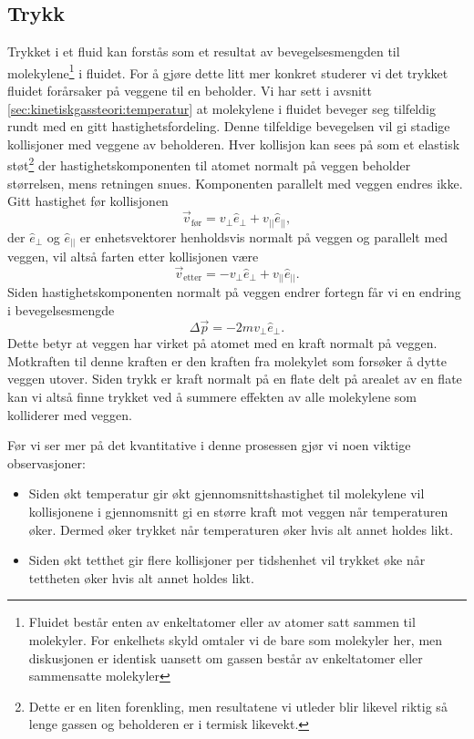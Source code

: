 \subsection{Trykk}
Trykket i et fluid kan forstås som et resultat av bevegelsesmengden til molekylene\footnote{Fluidet består enten av enkeltatomer eller av atomer satt sammen til molekyler. For enkelhets skyld omtaler vi de bare som molekyler her, men diskusjonen er identisk uansett om gassen består av enkeltatomer eller sammensatte molekyler} i fluidet. For å gjøre dette litt mer konkret studerer vi det  trykket fluidet forårsaker på veggene til en beholder. Vi har sett i avsnitt \ref{sec:kinetiskgassteori:temperatur} at molekylene i fluidet beveger seg tilfeldig rundt med en gitt hastighetsfordeling. Denne tilfeldige bevegelsen vil gi stadige kollisjoner med veggene av beholderen. Hver kollisjon kan sees på som et elastisk støt\footnote{Dette er en liten forenkling, men resultatene vi utleder blir likevel riktig så lenge gassen og beholderen er i termisk likevekt.} der hastighetskomponenten til atomet normalt på veggen beholder størrelsen, mens retningen snues. Komponenten parallelt med veggen endres ikke. Gitt hastighet før kollisjonen
\begin{displaymath}
	\vec{v}_\text{før} = v_\perp \hat{e}_\perp + v_{||} \hat{e}_{||},
\end{displaymath}
der $ \hat{e}_\perp$ og $\hat{e}_{||}$ er enhetsvektorer henholdsvis normalt på veggen og parallelt med veggen, vil altså farten etter kollisjonen være
\begin{displaymath}
	\vec{v}_\text{etter} = -v_\perp \hat{e}_\perp + v_{||} \hat{e}_{||}.
\end{displaymath}
Siden hastighetskomponenten normalt på veggen endrer fortegn får vi en endring i bevegelsesmengde 
\begin{displaymath}
	\Delta \vec{p} = -2mv_\perp\hat{e}_\perp.
\end{displaymath}
Dette betyr at veggen har virket på atomet med en kraft normalt på veggen. Motkraften til denne kraften er den kraften fra molekylet som forsøker å dytte veggen utover. Siden trykk er kraft normalt på en flate delt på arealet av en flate kan vi altså finne trykket ved å summere effekten av alle molekylene som kolliderer med veggen.

Før vi ser mer på det kvantitative i denne prosessen gjør vi noen viktige observasjoner:
\begin{itemize}
\item
Siden økt temperatur gir økt gjennomsnittshastighet til molekylene vil kollisjonene i gjennomsnitt gi en større kraft mot veggen når temperaturen øker. Dermed øker trykket når temperaturen øker hvis alt annet holdes likt.
\item
Siden økt tetthet gir flere kollisjoner per tidshenhet vil trykket øke når tettheten øker hvis alt annet holdes likt.
\end{itemize}

